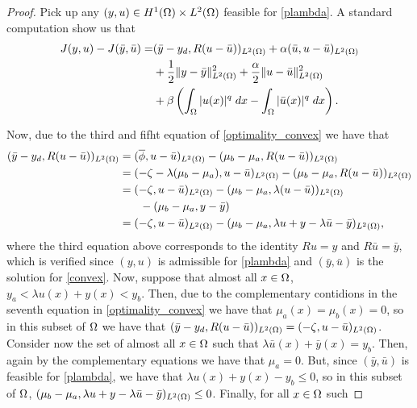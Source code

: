 \begin{proof}
    Pick up any $(y,u)\in H^{1}(\Omega)\times L^2(\Omega)$ feasible for \eqref{plambda}. A standard computation 
	show us that
     \begin{equation}\label{eq1:theorem2}
     \begin{split}
        J(y,u)-J(\bar{y},\bar{u})=&(\bar{y}-y_d, R(u-\bar{u}))_{L^2(\Omega)}+\alpha(\bar{u},u-\bar{u})_{L^2(\Omega)}\\
        &+\frac{1}{2}\lVert y-\bar{y} \rVert_{L^2(\Omega)}^2+\frac{\alpha}{2}\lVert u-\bar{u} \rVert_{L^2(\Omega)}^2\\
        &+\beta\left(\int_{\Omega}|u(x)|^q\; dx-\int_{\Omega}|\bar{u}(x)|^q\; dx\right).
        \end{split}
    \end{equation}

    Now, due to the third and fifht equation of \eqref{optimality_convex} we have that
    \begin{align*}
        (\bar{y}-y_d, R(u-\bar{u}))_{L^2(\Omega)}&=(\overline{\phi}, u-\bar{u})_{L^2(\Omega)}-(\mu_b-\mu_a,R(u-\bar{u}))_{L^2(\Omega)}\\
        &=(-\zeta-\lambda(\mu_b-\mu_a),u-\bar{u})_{L^2(\Omega)}-(\mu_b-\mu_a,R(u-\bar{u}))_{L^2(\Omega)}\\
        &=(-\zeta,u-\bar{u})_{L^2(\Omega)}-(\mu_b-\mu_a,\lambda(u-\bar{u}))_{L^2(\Omega)}\\
        &\phantom{=-}-(\mu_b-\mu_a,y-\bar{y})\\
        &=(-\zeta,u-\bar{u})_{L^2(\Omega)}-(\mu_b-\mu_a,\lambda u+y-\lambda \bar{u}-\bar{y})_{L^2(\Omega)},
    \end{align*}
  where the third equation above corresponds to the identity $Ru=y$ and $R\bar{u}=\bar{y}$, which is 
  verified since $(y,u)$ is admissible for \eqref{plambda} and $(\bar{y},\bar{u})$ is the solution for 
  \eqref{convex}. Now, suppose that almost all $x\in \Omega$, $y_a<\lambda u(x)+y(x)<y_b$. Then, due to the 
  complementary contidions in the seventh equation in \eqref{optimality_convex} we have that 
  $\mu_a(x)=\mu_b(x)=0$, so in this subset of $\Omega$ we have that 
  $(\bar{y}-y_d, R(u-\bar{u}))_{L^2(\Omega)}=(-\zeta,u-\bar{u})_{L^2(\Omega)}$. Consider now the set of almost 
  all $x\in \Omega$ such that $\lambda \bar{u}(x)+\bar{y}(x)=y_b$. Then, again by the complementary equations 
  we have that $\mu_a=0$. But, since $(\bar{y},\bar{u})$ is feasible for \eqref{plambda}, we have that 
  $\lambda u(x)+y(x)-y_b\le 0$, so in this subset of $\Omega$, 
  $(\mu_b-\mu_a,\lambda u+y-\lambda \bar{u}-\bar{y})_{L^2(\Omega)}\le 0$. Finally, for all $x\in \Omega$ such 

\end{proof}
